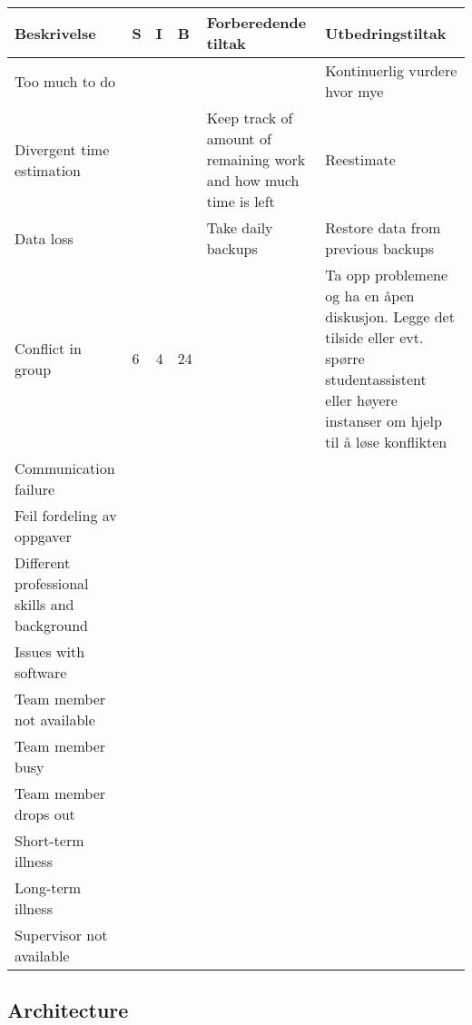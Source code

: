 \begin{table}[H]
\begin{tabular}{|p{4cm}|l|l|l|p{4.5cm}|p{4.5cm}|}
\hline
Beskrivelse  &S& I& B& Forberedende tiltak & Utbedringstiltak \\\hline
Too much to do&&&&& Kontinuerlig vurdere hvor mye \\\hline
Divergent time estimation & &&& Keep track of amount of remaining work and how much time is left & Reestimate\\\hline
Data loss&&&& Take daily backups &Restore data from previous backups\\\hline
Conflict in group& 6& 4& 24& &Ta opp problemene og ha en åpen diskusjon. Legge det tilside eller evt. spørre studentassistent eller høyere instanser om hjelp til å løse konflikten\\\hline
Communication failure &&&&&  \\\hline
Feil fordeling av oppgaver&&&&&\\\hline
Different professional skills and background&&&&&\\\hline
Issues with software &&&&&\\\hline
Team member not available &&&&&\\\hline
Team member busy &&&&&\\\hline
Team member drops out &&&&&\\\hline
Short-term illness &&&&&\\\hline
Long-term illness&&&&&\\\hline
Supervisor not available&&&&&\\\hline

\end{tabular}
\end{table}


\subsection{Architecture}